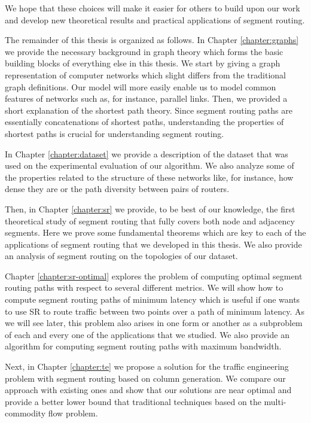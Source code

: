 We hope that these choices will make it easier for others to build upon our work and develop new theoretical results
and practical applications of segment routing.

The remainder of this thesis is organized as follows. In Chapter \ref{chapter:graphs} we provide the necessary
background in graph theory which forms the basic building blocks of everything else in this thesis. We start by
giving a graph representation of computer networks which slight differs from the traditional graph definitions.
Our model will more easily enable us to model common features of networks such as, for instance, parallel links. Then, we provided
a short explanation of the shortest path theory. Since segment routing paths are essentially concatenations of
shortest paths, understanding the properties of shortest paths is crucial  for understanding segment routing.

In Chapter \ref{chapter:dataset} we provide a description of the dataset that was used on the experimental evaluation
of our algorithm. We also analyze some of the properties related to the structure of these networks like, for instance, how 
dense they are or the path diversity between pairs of routers.

Then, in Chapter \ref{chapter:sr} we provide, to be best of our knowledge, the first theoretical study of segment routing 
that fully covers both node and adjacency segments. Here we prove some fundamental theorems which are key to
each of the applications of segment routing that we developed in this thesis. We also provide an analysis
of segment routing on the topologies of our dataset.

Chapter \ref{chapter:sr-optimal} explores the problem of computing optimal segment routing paths with respect to several different metrics.
We will show how to compute segment routing paths of minimum latency which is 
useful if one wants to use SR to route traffic between two points over a path of minimum latency. As we will see
later, this problem also arises in one form or another as a subproblem of each and every one of the applications
that we studied.
We also provide an algorithm for computing segment routing paths with maximum bandwidth.

Next, in Chapter \ref{chapter:te} we propose a solution for the traffic engineering problem with segment routing 
based on column generation.
We compare our approach with existing ones and show that our solutions are near optimal and provide a better lower bound
that traditional techniques based on the multi-commodity flow problem.

